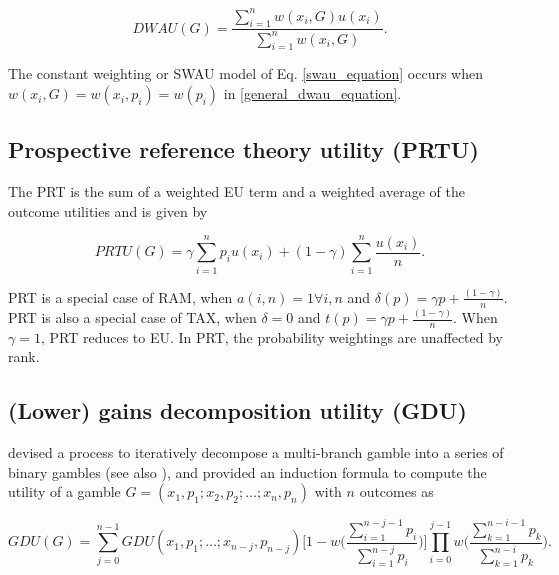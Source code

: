 \documentclass{article}\usepackage[]{graphicx}\usepackage[]{color}
\begin{document}
\begin{equation}
DWAU(G) = \frac{\displaystyle \sum\limits_{i=1}^{n} w(x_i, G) u(x_i)}{\displaystyle \sum\limits_{i=1}^{n} w(x_i, G)}.
\label{general_dwau_equation}
\end{equation}

The constant weighting or SWAU model of Eq. \eqref{swau_equation} occurs when $w(x_i, G) = w(x_i, p_i) = w(p_i)$ in \eqref{general_dwau_equation}.

\subsection{Prospective reference theory utility (PRTU)}

The \cite{Viscusi_1989} PRT is the sum of a weighted EU term and a weighted average of the outcome utilities and is given by

\begin{equation}
PRTU(G) = \gamma \sum\limits_{i=1}^{n} p_i u(x_i) + (1-\gamma) \sum\limits_{i=1}^{n} \displaystyle\frac{u(x_i)}{n}.
\label{prtu_equation}
\end{equation}

PRT is a special case of RAM, when $a(i, n) = 1 \forall i, n$ and $\delta(p) = \gamma p + \frac{(1-\gamma)}{n}$.
PRT is also a special case of TAX, when $\delta = 0$ and $t(p) = \gamma p + \frac{(1-\gamma)}{n}$.
When $\gamma = 1$, PRT reduces to EU. In PRT, the probability weightings are unaffected by rank.

\subsection{(Lower) gains decomposition utility (GDU)}

\citet[][p. 202]{Luce_2000} devised a process to iteratively decompose a multi-branch gamble into a series of binary gambles (see also \cite{Marley_Luce_2001, Marley_Luce_2005, Luce_Marley_2005}), and provided an induction formula to compute the utility of a gamble $G=(x_1,p_1; x_2, p_2; \ldots; x_n, p_n)$ with $n$ outcomes as

\begin{equation}
GDU(G) = \sum_{j=0}^{n-1} GDU(x_1,p_1; \ldots;x_{n-j},p_{n-j}) \Bigg[1 - w\Bigg(\frac{\displaystyle \sum_{i=1}^{n-j-1} p_i}{\displaystyle \sum_{i=1}^{n-j} p_i} \Bigg)\Bigg] \prod_{i=0}^{j-1} w\Bigg(\frac{\displaystyle \sum_{k=1}^{n-i-1} p_k}{\displaystyle \sum_{k=1}^{n-i} p_k} \Bigg).
\label{gdu_equation}
\end{equation}
\end{document}
